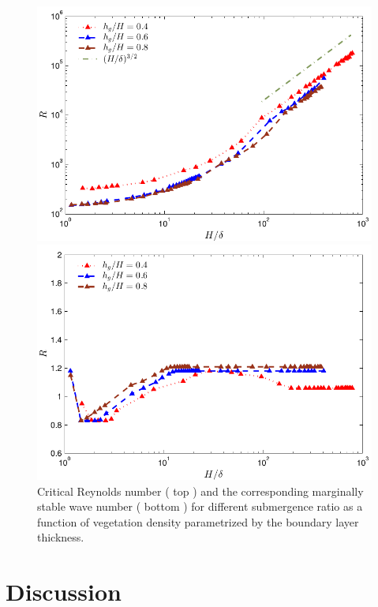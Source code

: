\documentclass[12pt]{report}   %
\begin{document}
\begin{figure}
 \centerline{\includegraphics{IsotropicDragR_vs_delta}}
 \centerline{\includegraphics{IsotropicDragDeltaVsK}}
 \caption{
Critical Reynolds number ( top ) and the corresponding marginally stable wave number ( bottom ) for different submergence ratio as a function of vegetation density parametrized by the boundary layer thickness. }
\label{Symmetric_Re_vs_delta}

\end{figure}




\chapter{Discussion}
\end{document}

